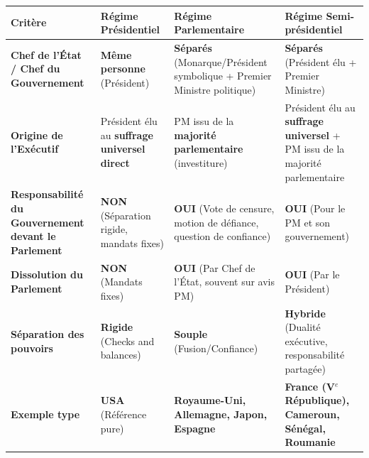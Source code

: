 \documentclass[11pt]{article}
\begin{document}
\begin{propriete}
\begin{center}
\begin{tabularx}{\linewidth}{|l|X|X|X|}\hline
\textbf{Critère} & \textbf{Régime Présidentiel} & \textbf{Régime Parlementaire} & \textbf{Régime Semi-présidentiel} \\ \hline
\textbf{Chef de l'État / Chef du Gouvernement} & \textbf{Même personne} (Président) & \textbf{Séparés} (Monarque/Président symbolique + Premier Ministre politique) & \textbf{Séparés} (Président élu + Premier Ministre) \\ \hline
\textbf{Origine de l'Exécutif} & Président élu au \textbf{suffrage universel direct} & PM issu de la \textbf{majorité parlementaire} (investiture) & Président élu au \textbf{suffrage universel} + PM issu de la majorité parlementaire \\ \hline
\textbf{Responsabilité du Gouvernement devant le Parlement} & \textbf{NON} (Séparation rigide, mandats fixes) & \textbf{OUI} (Vote de censure, motion de défiance, question de confiance) & \textbf{OUI} (Pour le PM et son gouvernement) \\ \hline
\textbf{Dissolution du Parlement} & \textbf{NON} (Mandats fixes) & \textbf{OUI} (Par Chef de l'État, souvent sur avis PM) & \textbf{OUI} (Par le Président) \\ \hline
\textbf{Séparation des pouvoirs} & \textbf{Rigide} (Checks and balances) & \textbf{Souple} (Fusion/Confiance) & \textbf{Hybride} (Dualité exécutive, responsabilité partagée) \\ \hline
\textbf{Exemple type} & \textbf{USA} (Référence pure) & \textbf{Royaume-Uni, Allemagne, Japon, Espagne} & \textbf{France (V$^e$ République), Cameroun, Sénégal, Roumanie} \\ \hline
\end{tabularx}
\end{center}
\end{propriete}
\end{document}
